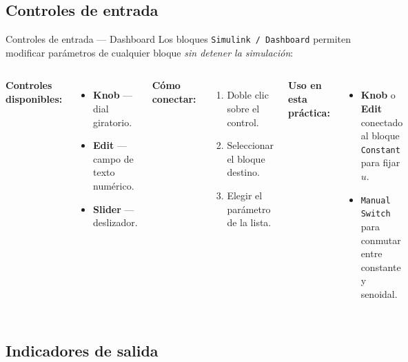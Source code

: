 \documentclass{beamer}
\begin{document}
\subsection{Controles de entrada}

\begin{frame}{Controles de entrada --- Dashboard}
Los bloques \texttt{Simulink / Dashboard} permiten modificar parámetros
de cualquier bloque \emph{sin detener la simulación}:
\begin{columns}[T]
  \textbf{Controles disponibles:}
  \begin{itemize}
    \item \textbf{Knob} --- dial giratorio.
    \item \textbf{Edit} --- campo de texto numérico.
    \item \textbf{Slider} --- deslizador.
  \end{itemize}
  \vspace{4pt}
  \textbf{Cómo conectar:}
  \begin{enumerate}\small
    \item Doble clic sobre el control.
    \item Seleccionar el bloque destino.
    \item Elegir el parámetro de la lista.
  \end{enumerate}
  \textbf{Uso en esta práctica:}
  \begin{itemize}
    \item \textbf{Knob} o \textbf{Edit} conectado al bloque \texttt{Constant}
          para fijar $u$.
    \item \texttt{Manual Switch} para conmutar entre constante y senoidal.
  \end{itemize}
\end{columns}
\end{frame}

\subsection{Indicadores de salida}
\end{document}
